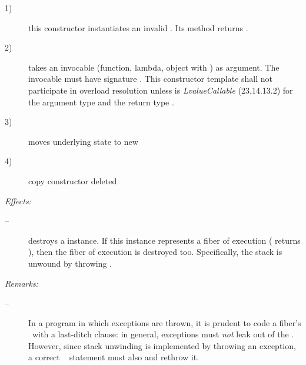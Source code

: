 \begin{description}
    \item[1)] this constructor instantiates an invalid \fiber. Its  method
              returns .
    \item[2)] takes an invocable (function, lambda, object with \op) as
              argument. The invocable must have signature . This constructor template shall not
              participate in overload resolution unless 
              is \emph{LvalueCallable} (23.14.13.2) for the argument
              type  and the return type \fiber.
               
    \item[3)] moves underlying state to new \fiber
    \item[4)] copy constructor deleted
\end{description}

\dtor

\emph{Effects:}
\begin{description}
    \item[--] destroys a \fiber instance. If this instance represents a fiber
              of execution ( returns ), then the fiber of
              execution is destroyed too. Specifically, the stack is unwound
              by throwing \unwindex.
\end{description}

\emph{Remarks:}
\begin{description}
    \item[--] In a program in which exceptions
              are thrown, it is prudent to code a fiber's \entryfn\ with a
              last-ditch  clause: in general, exceptions must
              \emph{not} leak out of the \entryfn. However, since stack
              unwinding is implemented by throwing an exception, a correct
              \entryfn\  statement must also
               and rethrow it.
\end{description}

